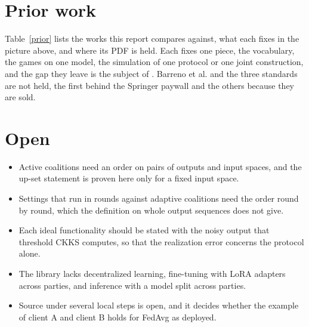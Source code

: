\documentclass{labreport}
\begin{document}
\section{Prior work}

Table~\ref{prior} lists the works this report compares against, what each fixes in the picture above, and where its PDF is held.
Each fixes one piece, the vocabulary, the games on one model, the simulation of one protocol or one joint construction, and the gap they leave is the subject of .
Barreno et al. and the three standards are not held, the first behind the Springer paywall and the others because they are sold.



\section{Open}

\begin{itemize}
  \item Active coalitions need an order on pairs of outputs and input spaces, and the up-set statement is proven here only for a fixed input space.
  \item Settings that run in rounds against adaptive coalitions need the order round by round, which the definition on whole output sequences does not give.
  \item Each ideal functionality should be stated with the noisy output that threshold CKKS computes, so that the realization error concerns the protocol alone.
  \item The library lacks decentralized learning, fine-tuning with LoRA adapters across parties, and inference with a model split across parties.
  \item Source under several local steps is open, and it decides whether the example of client A and client B holds for FedAvg as deployed.
\end{itemize}


\lrreferences
\end{document}
